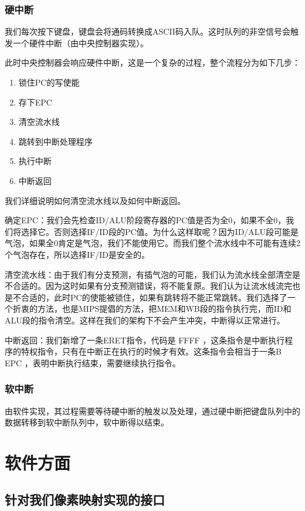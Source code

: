 \subsubsection{硬中断}
我们每次按下键盘，键盘会将通码转换成ASCII码入队。这时队列的非空信号会触发一个硬件中断（由中央控制器实现）。

此时中央控制器会响应硬件中断，这是一个复杂的过程，整个流程分为如下几步：

\begin{enumerate}
    \item 锁住PC的写使能
    \item 存下EPC
    \item 清空流水线
    \item 跳转到中断处理程序
    \item 执行中断
    \item 中断返回
\end{enumerate}

我们详细说明如何清空流水线以及如何中断返回。

确定EPC：我们会先检查ID/ALU阶段寄存器的PC值是否为全0，如果不全0，我们将选择它。否则选择IF/ID段的PC值。为什么这样取呢？因为ID/ALU段可能是气泡，如果全0肯定是气泡，我们不能使用它。而我们整个流水线中不可能有连续2个气泡存在，所以选择IF/ID是安全的。

清空流水线：由于我们有分支预测，有插气泡的可能，我们认为流水线全部清空是不合适的。因为这时如果有分支预测错误，将不能复原。我们认为让流水线流完也是不合适的，此时PC的使能被锁住，如果有跳转将不能正常跳转。我们选择了一个折衷的方法，也是MIPS提倡的方法，把MEM和WB段的指令执行完，而ID和ALU段的指令清空。这样在我们的架构下不会产生冲突，中断得以正常进行。

中断返回：我们新增了一条ERET指令，代码是  FFFF  ，这条指令是中断执行程序的特权指令，只有在中断正在执行的时候才有效。这条指令会相当于一条B  EPC  ，表明中断执行结束，需要继续执行指令。

\subsubsection{软中断}
由软件实现，其过程需要等待硬中断的触发以及处理，通过硬中断把键盘队列中的数据转移到软中断队列中，软中断得以结束。

\section{软件方面}

\subsection{针对我们像素映射实现的接口}

